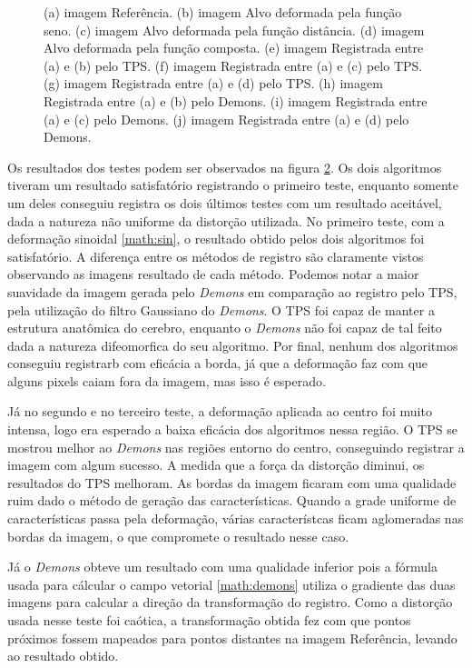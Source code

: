 \begin{figure}[h]
\begin{subfigure}[t]{0.25\textwidth}
	  \label{fig:sindist-image-demon}
	\end{subfigure}
	\caption{(a) imagem Referência. (b) imagem Alvo deformada pela função seno. (c) imagem Alvo deformada pela função 
			distância. (d) imagem Alvo deformada pela função composta. (e) imagem Registrada entre (a) e (b) pelo TPS. 
			(f) imagem Registrada entre (a) e (c) pelo TPS. (g) imagem Registrada entre (a) e (d) pelo TPS. (h) imagem 
			Registrada entre (a) e (b) pelo Demons. (i) imagem Registrada entre (a) e (c) pelo Demons. (j) imagem 
			Registrada entre (a) e (d) pelo Demons.}
	\label{fig:resultados}
\end{figure}
	Os resultados dos testes podem ser observados na figura \ref{fig:resultados}.
Os dois algoritmos tiveram um resultado satisfatório registrando o primeiro teste, enquanto somente um deles conseguiu
registra os dois últimos testes com um resultado aceitável, dada a natureza não uniforme da distorção utilizada. 
No primeiro teste, com a deformação sinoidal \ref{math:sin}, o resultado obtido pelos dois algoritmos foi satisfatório.
A diferença entre os métodos de registro são claramente vistos observando as imagens resultado de cada método. Podemos
notar a maior suavidade da imagem gerada pelo \textit{Demons} em comparação ao registro pelo TPS, pela utilização do
filtro Gaussiano do \textit{Demons}. O TPS foi capaz de manter a estrutura anatômica do cerebro, enquanto o 
\textit{Demons} não foi capaz de tal feito dada a natureza difeomorfica do seu algoritmo. Por final, nenhum dos 
algoritmos conseguiu registrarb com eficácia a borda, já que a deformação faz com que alguns pixels caiam fora da 
imagem, mas isso é esperado.

  Já no segundo e no terceiro teste, a deformação aplicada ao centro foi muito intensa, logo era esperado a baixa 
eficácia dos algoritmos nessa região. O TPS se mostrou melhor ao \textit{Demons} nas regiões entorno do centro, 
conseguindo registrar a imagem com algum sucesso. A medida que a força da distorção diminui, os resultados do TPS 
melhoram. As bordas da imagem ficaram com uma qualidade ruim dado o método de geração das características. Quando a 
grade uniforme de características passa pela deformação, várias característcas ficam aglomeradas nas bordas da imagem, 
o que compromete o resultado nesse caso.

	Já o \textit{Demons} obteve um resultado com uma qualidade inferior pois a fórmula usada para cálcular o campo 
vetorial \ref{math:demons} utiliza o gradiente das duas imagens para calcular a direção da transformação do registro. 
Como a distorção usada nesse teste foi caótica, a transformação obtida fez com que pontos próximos fossem mapeados para 
pontos distantes na imagem Referência, levando ao resultado obtido.